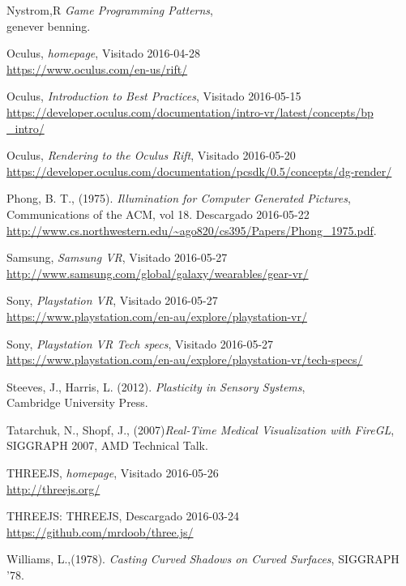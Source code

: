 \documentclass[12pt]{article}
\begin{document}
\begin{thebibliography}{9}
Nystrom,R \textit{Game Programming Patterns},\\
genever benning.

Oculus, \textit{homepage},
Visitado 2016-04-28
\\\url{https://www.oculus.com/en-us/rift/}

Oculus, \textit{Introduction to Best Practices},
Visitado 2016-05-15
\\\url{https://developer.oculus.com/documentation/intro-vr/latest/concepts/bp	
_intro/}

Oculus, \textit{Rendering to the Oculus Rift},
Visitado 2016-05-20
\\\url{https://developer.oculus.com/documentation/pcsdk/0.5/concepts/dg-render/}

Phong, B. T., (1975). \textit{Illumination for Computer Generated Pictures},\\
Communications of the ACM, vol 18.
Descargado 2016-05-22
\\\url{http://www.cs.northwestern.edu/~ago820/cs395/Papers/Phong_1975.pdf}.  

Samsung, \textit{Samsung VR},
Visitado 2016-05-27
\\\url{http://www.samsung.com/global/galaxy/wearables/gear-vr/}

Sony, \textit{ Playstation VR},
Visitado 2016-05-27
\\\url{https://www.playstation.com/en-au/explore/playstation-vr/}

Sony, \textit{ Playstation VR Tech specs},
Visitado 2016-05-27
\\\url{https://www.playstation.com/en-au/explore/playstation-vr/tech-specs/}


Steeves, J., Harris, L. (2012). \textit{Plasticity in Sensory Systems},\\
Cambridge University Press.


Tatarchuk, N., Shopf, J., (2007)\textit{Real-Time Medical Visualization with FireGL},
SIGGRAPH 2007, AMD Technical Talk.

THREEJS, \textit{homepage},
Visitado 2016-05-26
\\\url{http://threejs.org/}

THREEJS: THREEJS,
Descargado 2016-03-24
\\\url{https://github.com/mrdoob/three.js/}

Williams, L.,(1978). \textit{Casting Curved Shadows on Curved Surfaces},
SIGGRAPH '78. 

\end{thebibliography}
\end{document}
